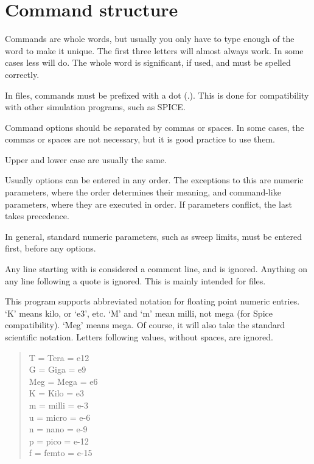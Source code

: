 \section{Command structure}

 Commands are whole words, but usually you only have to type enough of the
word to make it unique.  The first three letters will almost always work.
In some cases less will do.  The whole word is significant, if used, and
must be spelled correctly.

In files, commands must be prefixed with a dot (.).  This is done for
compatibility with other simulation programs, such as SPICE.

Command options should be separated by commas or spaces.  In some cases, the
commas or spaces are not necessary, but it is good practice to use them.

Upper and lower case are usually the same.

 Usually options can be entered in any order.  The exceptions to this are
numeric parameters, where the order determines their meaning, and
command-like parameters, where they are executed in order.  If parameters
conflict, the last takes precedence.

In general, standard numeric parameters, such as sweep limits, must be
entered first, before any options.

 Any line starting with {\tt *} is considered a comment line, and is
ignored.  Anything on any line following a quote is ignored.  This is mainly
intended for files.


 This program supports abbreviated notation for floating point numeric
entries.  `K' means kilo, or `e3', etc.  `M' and `m' mean milli, not mega
(for Spice compatibility).  `Meg' means mega.  Of course, it will also take
the standard scientific notation.  Letters following values, without spaces,
are ignored.

\begin{verse}
T = Tera = e12\\
G = Giga = e9\\
Meg = Mega = e6\\
K = Kilo = e3\\
m = milli = e-3\\
u = micro = e-6\\
n = nano = e-9\\
p = pico = e-12\\
f = femto = e-15
\end{verse}

